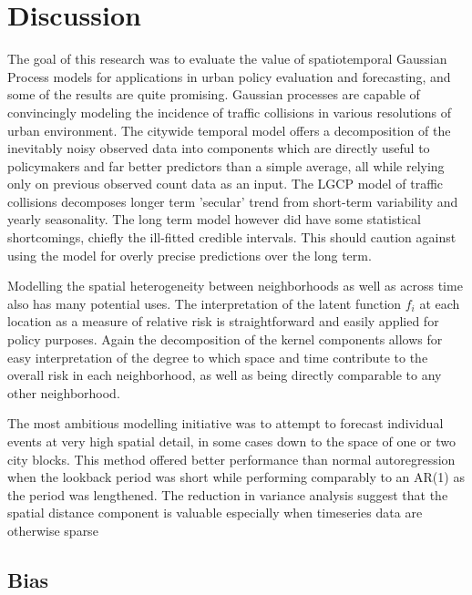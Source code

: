 \section{Discussion}
\label{discussion}

The goal of this research was to evaluate the value of spatiotemporal Gaussian Process models for applications in urban policy evaluation and forecasting, and some of the results are quite promising. Gaussian processes are capable of convincingly modeling the incidence of traffic collisions in various resolutions of urban environment. The citywide temporal model offers a decomposition of the inevitably noisy observed data into components which are directly useful to policymakers and far better predictors than a simple average, all while relying only on previous observed count data as an input. The LGCP model of traffic collisions decomposes longer term 'secular' trend from short-term variability and yearly seasonality. The long term model however did have some statistical shortcomings, chiefly the ill-fitted credible intervals. This should caution against using the model for overly precise predictions over the long term. \par

Modelling the spatial heterogeneity between neighborhoods as well as across time also has many potential uses. The interpretation of the latent function $f_i$ at each location as a measure of relative risk is straightforward and easily applied for policy purposes. Again the decomposition of the kernel components allows for easy interpretation of the degree to which space and time contribute to the overall risk in each neighborhood, as well as being directly comparable to any other neighborhood. \par

The most ambitious modelling initiative was to attempt to forecast individual events at very high spatial detail, in some cases down to the space of one or two city blocks. This method offered better performance than normal autoregression when the lookback period was short while performing comparably to an AR(1) as the period was lengthened. The reduction in variance analysis suggest that the spatial distance component is valuable especially when timeseries data are otherwise sparse 



\subsection{Bias}

